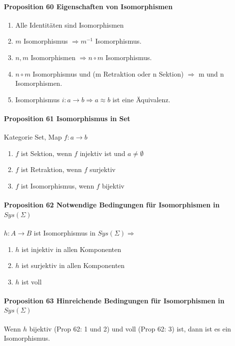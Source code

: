 \paragraph{Proposition 60 Eigenschaften von Isomorphismen}
\begin{enumerate}
\item Alle Identitäten sind Isomorphismen
\item $m$ Isomorphismus $\Rightarrow m^{-1}$ Isomorphismus.
\item $n, m$ Isomorphismen $\Rightarrow n \circ m$ Isomorphismus.
\item $n \circ m$ Isomorphismus und (m Retraktion oder n Sektion) $\Rightarrow $ m und n Isomorphismen.
\item Isomorphismus $i: a \rightarrow b \Rightarrow a \approx b$ ist eine Äquivalenz.
\end{enumerate}

\paragraph{Proposition 61 Isomorphismus in Set}
Kategorie Set, Map $f: a \rightarrow b$
\begin{enumerate}
\item $f$ ist Sektion, wenn $f$ injektiv ist und $a \neq \emptyset$
\item $f$ ist Retraktion, wenn $f$ surjektiv 
\item $f$ ist Isomorphismus, wenn $f$ bijektiv
\end{enumerate}

\paragraph{Proposition 62 Notwendige Bedingungen für Isomorphismen in $Sys(\Sigma)$}
$h: A \rightarrow B$ ist Isomorphismus in $Sys(\Sigma) \Rightarrow$
\begin{enumerate}
\item $h$ ist injektiv in allen Komponenten
\item $h$ ist surjektiv in allen Komponenten
\item $h$ ist voll
\end{enumerate}
 
\paragraph{Proposition 63 Hinreichende Bedingungen für Isomorphismen in $Sys(\Sigma)$}
Wenn $h$ bijektiv (Prop 62: 1 und 2) und voll (Prop 62: 3) ist, dann ist es ein Isomorphismus.

